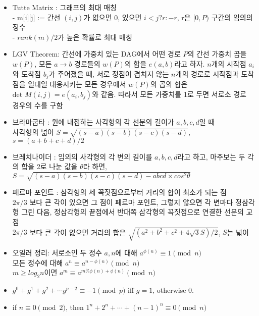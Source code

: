\documentclass[landscape, 8pt, a4paper, oneside]{extarticle}
\begin{document}
\begin{multicols*}{3}
\begin{itemize}[noitemsep]
\item Tutte Matrix : 그래프의 최대 매칭\\
- m[i][j] := 간선 $(i, j)$가 없으면 0, 있으면 $i < j ? r : -r$, r은 $[0,P)$ 구간의 임의의 정수\\
- $rank(m) / 2$가 높은 확률로 최대 매칭

\item LGV Theorem: 간선에 가중치 있는 DAG에서 어떤 경로 $P$의 간선 가중치 곱을 $w(P)$, 모든 $a\rightarrow b$ 경로들의 $w(P)$의 합을 $e(a,b)$라고 하자. $n$개의 시작점 $a_i$와 도착점 $b_j$가 주어졌을 때, 서로 정점이 겹치지 않는 $n$개의 경로로 시작점과 도착점을 일대일 대응시키는 모든 경우에서 $w(P)$의 곱의 합은 $\text{det }M(i,j)=e(a_i,b_j)$와 같음. 따라서 모든 가중치를 1로 두면 서로소 경로 경우의 수를 구함

\item 브라마굽타 : 원에 내접하는 사각형의 각 선분의 길이가 $a, b, c, d$일 때\\
사각형의 넓이 $S=\sqrt{(s-a)(s-b)(s-c)(s-d)}$, $s=(a+b+c+d)/2$

\item 브레치나이더 : 임의의 사각형의 각 변의 길이를 $a,b,c,d$라고 하고, 마주보는 두 각의 합을 2로 나눈 값을 $\theta$라 하면, $S=\sqrt{(s-a)(s-b)(s-c)(s-d)-abcd\times cos^2 \theta}$

\item 페르마 포인트 : 삼각형의 세 꼭짓점으로부터 거리의 합이 최소가 되는 점\\
$2\pi/3$ 보다 큰 각이 있으면 그 점이 페르마 포인트, 그렇지 않으면 각 변마다 정삼각형 그린 다음, 정삼각형의 끝점에서 반대쪽 삼각형의 꼭짓점으로 연결한 선분의 교점\\
$2\pi/3$ 보다 큰 각이 없으면 거리의 합은 $\sqrt{(a^2 + b^2 + c^2 + 4\sqrt 3 S) / 2}$, $S$는 넓이

\item 오일러 정리: 서로소인 두 정수 $a,n$에 대해 $a^{\phi(n)}\equiv 1 \pmod n$\\
모든 정수에 대해 $a^n \equiv a^{n-\phi(n)} \pmod n$\\
$m\geq log_2 n$이면 $a^m\equiv a^{m\%\phi(n)+\phi(n)}\pmod n$

\item $g^0+g^1+g^2+\cdots g^{p-2}\equiv -1 \pmod p$ iff $g=1$, otherwise $0$.

\item if $n \equiv 0 \pmod 2$, then $1^n + 2^n + \cdots + (n-1)^n \equiv 0 \pmod n$

\end{itemize}


\end{multicols*}
\end{document}
